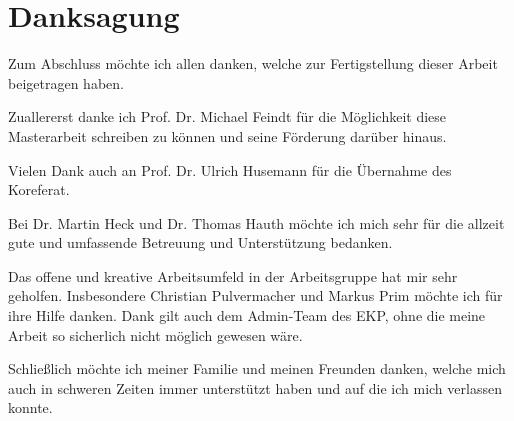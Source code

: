 \chapter*{Danksagung}

Zum Abschluss möchte ich allen danken, welche zur Fertigstellung dieser Arbeit beigetragen haben.

Zuallererst danke ich Prof. Dr. Michael Feindt für die Möglichkeit diese Masterarbeit schreiben zu können und seine Förderung darüber hinaus.

Vielen Dank auch an Prof. Dr. Ulrich Husemann für die Übernahme des Koreferat.

Bei Dr. Martin Heck und Dr. Thomas Hauth möchte ich mich sehr für die allzeit gute und umfassende Betreuung und Unterstützung bedanken.

Das offene und kreative Arbeitsumfeld in der Arbeitsgruppe hat mir sehr geholfen. Insbesondere Christian Pulvermacher und Markus Prim möchte ich für ihre Hilfe danken. Dank gilt auch dem Admin-Team des EKP, ohne die meine Arbeit so sicherlich nicht möglich gewesen wäre.

Schließlich möchte ich meiner Familie und meinen Freunden danken, welche mich auch in schweren Zeiten immer unterstützt haben und auf die ich mich verlassen konnte.